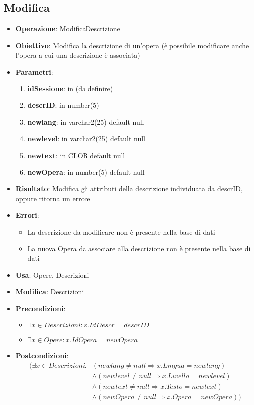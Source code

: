 \subsection{Modifica}
\begin{itemize}
	\item \textbf{Operazione}: ModificaDescrizione
	\item \textbf{Obiettivo}: Modifica la descrizione di un'opera (è possibile modificare anche l'opera a cui una descrizione è associata)
	\item \textbf{Parametri}:
	\begin{enumerate}
		\item \textbf{idSessione}: in (da definire)
		\item \textbf{descrID}: in number(5)
		\item \textbf{newlang}: in varchar2(25) default null
		\item \textbf{newlevel}: in varchar2(25) default null
		\item \textbf{newtext}: in CLOB default null
		\item \textbf{newOpera}: in number(5) default null
	\end{enumerate}
	\item \textbf{Risultato}: Modifica gli attributi della descrizione individuata da descrID, oppure ritorna un errore
	\item \textbf{Errori}: 
	\begin{itemize}
		\item La descrizione da modificare non è presente nella base di dati
		\item La nuova Opera da associare alla descrizione non è presente nella base di dati
	\end{itemize}
	\item \textbf{Usa}: Opere, Descrizioni
	\item \textbf{Modifica}: Descrizioni
	\item \textbf{Precondizioni}:
	\begin{itemize}
		\item $\exists x \in Descrizioni : x.IdDescr = descrID$
		\item $\exists x \in Opere : x.IdOpera = newOpera$
	\end{itemize}
	\item \textbf{Postcondizioni}:
	\begin{align*} (\exists x \in Descrizioni.
		& (newlang \ne null \Rightarrow x.Lingua = newlang) \\
		& \land (newlevel \ne null \Rightarrow x.Livello = newlevel) \\
		& \land (newtext \ne null \Rightarrow x.Testo = newtext) \\
		& \land (newOpera \ne null \Rightarrow x.Opera = newOpera))
	\end{align*}
\end{itemize}

